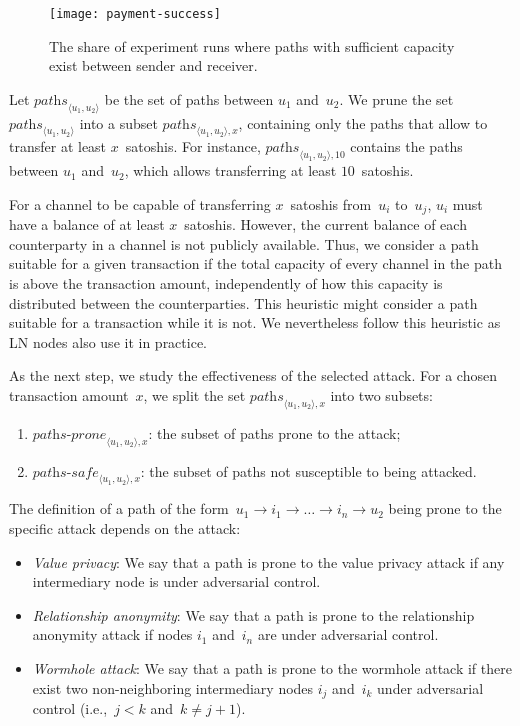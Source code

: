 \begin{figure}
	\centering
	\texttt{[image: payment-success]}
	\caption{The share of experiment runs where paths with sufficient capacity exist between sender and receiver.}
	\label{fig:payment-success}
\end{figure}

Let $\textit{paths}_{\langle u_1, u_2 \rangle}$ be the set of paths between $u_1$ and~$u_2$.
We prune the set $\textit{paths}_{\langle u_1, u_2 \rangle}$ into a subset $\textit{paths}_{\langle u_1, u_2 \rangle, x}$, containing only the paths that allow to transfer at least $x$~satoshis.
For instance, $\textit{paths}_{\langle u_1, u_2 \rangle, 10}$ contains the paths between $u_1$ and~$u_2$, which allows transferring at least $10$~satoshis.

For a channel to be capable of transferring $x$~satoshis from~$u_i$ to~$u_j$, $u_i$ must have a balance of at least $x$~satoshis.
However, the current balance of each counterparty in a channel is not publicly available.
Thus, we consider a path suitable for a given transaction if the total capacity of every channel in the path is above the transaction amount, independently of how this capacity is distributed between the counterparties.
This heuristic might consider a path suitable for a transaction while it is not.
We nevertheless follow this heuristic as LN nodes also use it in practice.

As the next step, we study the effectiveness of the selected attack.
For a chosen transaction amount~$x$, we split the set $\textit{paths}_{\langle u_1, u_2 \rangle, x}$ into two subsets:

\begin{enumerate}
	\item $\textit{paths-prone}_{\langle u_1, u_2 \rangle, x}$: the subset of paths prone to the attack;
	\item $\textit{paths-safe}_{\langle u_1, u_2 \rangle, x}$: the subset of paths not susceptible to being attacked.
\end{enumerate}

The definition of a path of the form~$u_1 \rightarrow i_1 \rightarrow \ldots \rightarrow i_n \rightarrow u_2$ being prone to the specific attack depends on the attack:

\begin{itemize}
	\item \textit{Value privacy}: We say that a path is prone to the value privacy attack if any intermediary node is under adversarial control.
	
	\item \textit{Relationship anonymity}: We say that a path is prone to the relationship anonymity attack if nodes $i_1$ and~$i_n$ are under adversarial control.
	
	\item \textit{Wormhole attack}: We say that a path is prone to the wormhole attack if there exist two non-neighboring intermediary nodes $i_j$ and~$i_k$  under adversarial control (i.e.,~$j < k$ and~$k \neq j + 1$).
\end{itemize}

